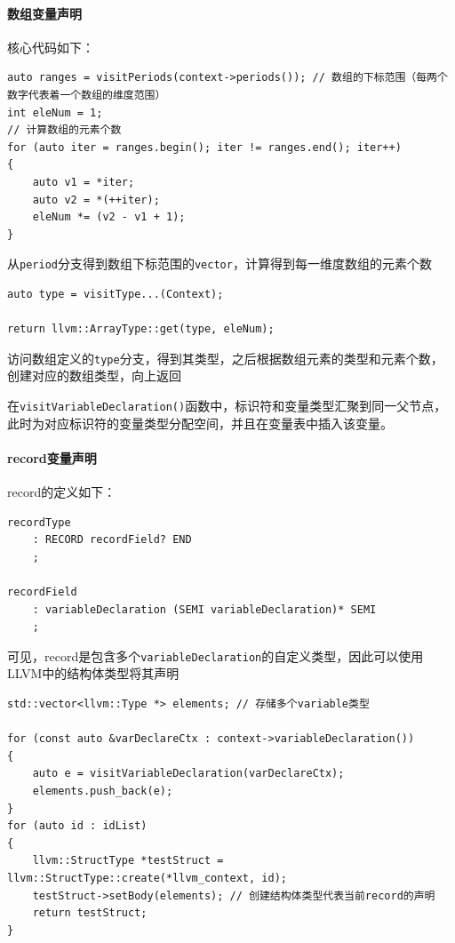\documentclass[lang=cn,11pt,a4paper,cite=authornum]{paper}
\begin{document}
\paragraph{数组变量声明} 核心代码如下：

\begin{code}
    \begin{verbatim}
auto ranges = visitPeriods(context->periods()); // 数组的下标范围（每两个数字代表着一个数组的维度范围）
int eleNum = 1;
// 计算数组的元素个数
for (auto iter = ranges.begin(); iter != ranges.end(); iter++)
{
    auto v1 = *iter;
    auto v2 = *(++iter);
    eleNum *= (v2 - v1 + 1);
}
\end{verbatim}
\end{code}

从\texttt{period}分支得到数组下标范围的\texttt{vector}，计算得到每一维度数组的元素个数

\begin{code}
    \begin{verbatim}
auto type = visitType...(Context);

return llvm::ArrayType::get(type, eleNum);
\end{verbatim}
\end{code}

访问数组定义的\texttt{type}分支，得到其类型，之后根据数组元素的类型和元素个数，创建对应的数组类型，向上返回

在\texttt{visitVariableDeclaration()}函数中，标识符和变量类型汇聚到同一父节点，此时为对应标识符的变量类型分配空间，并且在变量表中插入该变量。

\paragraph{record变量声明} record的定义如下：

\begin{code}
    \begin{verbatim}
recordType
    : RECORD recordField? END
    ;

recordField
    : variableDeclaration (SEMI variableDeclaration)* SEMI
    ;
\end{verbatim}
\end{code}

可见，record是包含多个\texttt{variableDeclaration}的自定义类型，因此可以使用LLVM中的结构体类型将其声明

\begin{code}
    \begin{verbatim}
std::vector<llvm::Type *> elements; // 存储多个variable类型

for (const auto &varDeclareCtx : context->variableDeclaration())
{
    auto e = visitVariableDeclaration(varDeclareCtx);
    elements.push_back(e);
}
for (auto id : idList)
{
    llvm::StructType *testStruct = llvm::StructType::create(*llvm_context, id);
    testStruct->setBody(elements); // 创建结构体类型代表当前record的声明
    return testStruct;
}
\end{verbatim}
\end{code}
\end{document}
